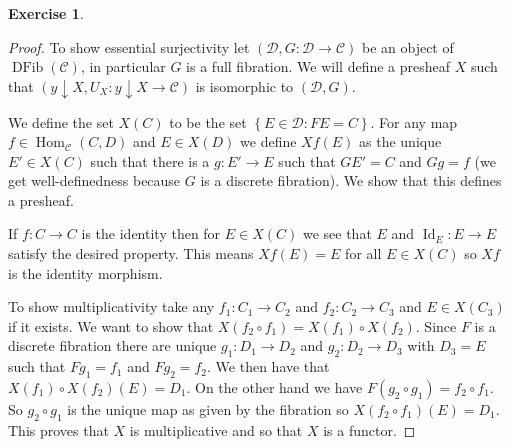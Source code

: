 \documentclass{article}
\DeclareMathOperator{\Id}{Id}
\DeclareMathOperator{\Hom}{Hom}
\newcommand{\cat}{\mathcal{C}}
\newcommand{\catt}{\mathcal{D}}
\newcommand{\setwith}[2]{\left\{#1:#2\right\}}
\DeclareMathOperator{\dfib}{DFib}
\theoremstyle{definition}
\newtheorem{question}{Exercise}
\begin{document}
\begin{question}
\begin{enumerate}[(a)]
\begin{proof}
                  To show essential surjectivity let \((\catt,G:\catt\to\cat)\)
                  be an object of \(\dfib(\cat)\), in particular \(G\) is a full
                  fibration. We will define a presheaf \(X\) such that
                  \((y\downarrow X,U_{X}:y\downarrow X\to \cat)\) is isomorphic
                  to \((\catt,G)\).

                  We define the set \(X(C)\) to be the set
                  \(\setwith{E\in\catt}{FE=C}\). For any map
                  \(f\in\Hom_{\cat}(C,D)\) and \(E\in X(D)\) we define \(Xf(E)\)
                  as the unique \(E'\in X(C)\) such that there is a \(g:E'\to
                  E\) such that \(GE'=C\) and \(Gg=f\) (we get well-definedness
                  because \(G\) is a discrete fibration). We show that this
                  defines a presheaf.

                  If \(f:C\to C\) is the identity then for \(E\in X(C)\) we see
                  that \(E\) and \(\Id_{E}:E\to E\) satisfy the desired
                  property. This means \(Xf(E)=E\) for all \(E\in X(C)\) so
                  \(Xf\) is the identity morphism.

                  To show multiplicativity take any \(f_{1}:C_{1}\to C_{2}\) and
                  \(f_{2}:C_{2}\to C_{3}\) and \(E\in X(C_{3})\) if it exists.
                  We want to show that \(X(f_{2}\circ f_{1})=X(f_{1})\circ
                  X(f_{2})\). Since \(F\) is a discrete fibration there are
                  unique \(g_{1}:D_{1}\to D_{2}\) and \(g_{2}:D_{2}\to D_{3}\)
                  with \(D_{3}=E\) such that \(Fg_{1}=f_{1}\) and
                  \(Fg_{2}=f_{2}\). We then have that \(X(f_{1})\circ
                  X(f_{2})(E)=D_{1}\). On the other hand we have \(F(g_{2}\circ
                  g_{1})=f_{2}\circ f_{1}\). So \(g_{2}\circ g_{1}\) is the
                  unique map as given by the fibration so \(X(f_{2}\circ
                  f_{1})(E)=D_{1}\). This proves that \(X\) is multiplicative
                  and so that \(X\) is a functor.


\end{proof}
\end{enumerate}
\end{question}
\end{document}

